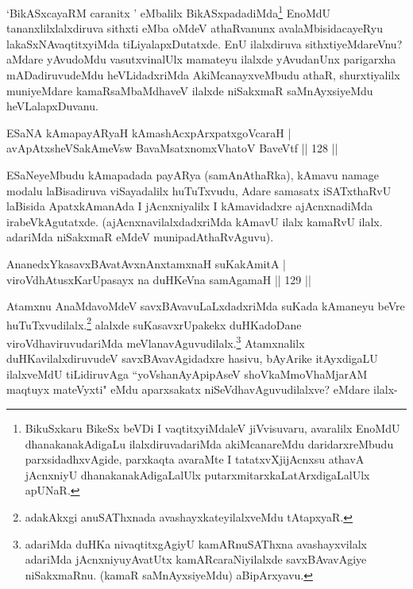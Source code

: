 \begin{artha}
`BikASxcayaRM caranitx ' eMbalilx BikASxpadadiMda\footnote{BikuSxkaru BikeSx beVDi I vaqtitxyiMdaleV jiVvisuvaru, avaralilx EnoMdU dhanakanakAdigaLu ilalxdiruvadariMda  akiMcanareMdu daridarxreMbudu parxsidadhxvAgide, parxkaqta avaraMte I tatatxvXjijAcnxsu athavA jAcnxniyU dhanakanakAdigaLalUlx putarxmitarxkaLatArxdigaLalUlx apUNaR.} EnoMdU tananxlilxlalxdiruva sithxti eMba oMdeV athaRvanunx avalaMbisida\break cayeRyu lakaSxNAvaqtitxyiMda tiLiyalapxDutatxde. EnU ilalxdiruva sithxtiyeMdareVnu? aMdare yAvudoMdu vasutxvinalUlx mamateyu ilalxde yAvudanUnx parigarxha mADadiruvudeMdu heVLidadxriMda AkiMcanayxveMbudu athaR, shurxtiyalilx muniyeMdare kamaR\break saMbaMdhaveV ilalxde niSakxmaR saMnAyxsiyeMdu heVLalapxDuvanu.
\end{artha}%


\begin{shl}
ESaNA kAmapayARyaH kAmashAcxpArxpatxgoVcaraH |\\
avApAtxsheVSakAmeV\s sw BavaMsatxnomxVhatoV BaveVtf \hfill || 128 ||
\end{shl}

\begin{artha}
ESaNeyeMbudu kAmapadada payARya (samAnAthaRka), kAmavu namage modalu laBisadiruva viSayadalilx huTuTxvudu, Adare samasatx iSATxthaRvU laBisida ApatxkAmanAda I jAcnxniyalilx I kAmavidadxre ajAcnxnadiMda irabeVkAgutatxde. (ajAcnxnavilalxdadxriMda kAmavU ilalx kamaRvU ilalx. adariMda  niSakxmaR eMdeV munipadAthaRvAguvu).
\end{artha}


\begin{shl}
AnanedxYkasavxBAvatAvxnAnx\s \s tamxnaH suKakAmitA |\\
viroVdhAtusxKarUpasayx na duHKeVna samAgamaH \hfill || 129 ||
\end{shl}

\begin{artha}
Atamxnu AnaMdavoMdeV savxBAvavuLaLxdadxriMda suKada kAmaneyu beVre huTuTxvudilalx.\footnote{adakAkxgi anuSAThxnada avashayxkateyilalxveMdu tAtapxyaR.} alalxde suKasavxrUpakekx duHKadoDane viroVdhaviruvudariMda meVlanavAguvudilalx.\footnote{adariMda duHKa nivaqtitxgAgiyU kamARnuSAThxna avashayxvilalx adariMda jAcnxniyu\break yAvatUtx kamARcaraNiyilalxde savxBAvavAgiye niSakxmaRnu. (kamaR saMnAyxsiyeMdu) aBipArxyavu.} Atamxnalilx duHKavilalxdiruvudeV savxBAvavAgidadxre hasivu, bAyArike itAyxdigaLU ilalxveMdU tiLidiruvAga ``yoV\s shanAyApipAseV shoVkaMmoVhaMjarAM maqtuyx mateVyxti" eMdu aparxsakatx niSeVdhavAguvudilalxve? eMdare ilalx-
\end{artha}%

